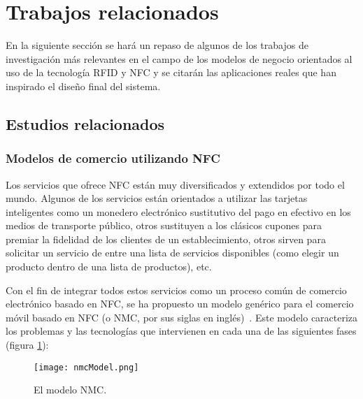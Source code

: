 \section{Trabajos relacionados}
  En la siguiente sección se hará un repaso de algunos de los trabajos de
investigación más relevantes en el campo de los modelos de negocio orientados
al uso de la tecnología \acs{RFID} y \acs{NFC} y se citarán las aplicaciones
reales que han inspirado el diseño final del sistema.

  \subsection{Estudios relacionados}
  \label{subsec:related}
    \subsubsection{Modelos de comercio utilizando NFC}
  Los servicios que ofrece \acs{NFC} están muy diversificados y extendidos
  por todo el mundo. Algunos de los servicios están orientados a utilizar
  las tarjetas inteligentes como un monedero electrónico sustitutivo del
  pago en efectivo en los medios de transporte público, otros sustituyen
  a los clásicos cupones para premiar la fidelidad de los clientes de un
  establecimiento, otros sirven para solicitar un servicio de entre una
  lista de servicios disponibles (como elegir un producto dentro de una
  lista de productos), etc.

  Con el fin de integrar todos estos servicios como un proceso común de
  comercio electrónico basado en NFC, se ha propuesto un modelo genérico
  para el comercio móvil basado en \acs{NFC} (o \acs{NMC}, por sus siglas
  en inglés)~\cite{bib:nfcCommerce}. Este modelo caracteriza los problemas y
  las tecnologías que intervienen en cada una de las siguientes fases
  (figura \ref{fig:nmcModel}):

  \begin{figure}[!h]
    \begin{center}
      \texttt{[image: nmcModel.png]}
      \caption{El modelo \acs{NMC}.}
      \label{fig:nmcModel}
    \end{center}
  \end{figure}

